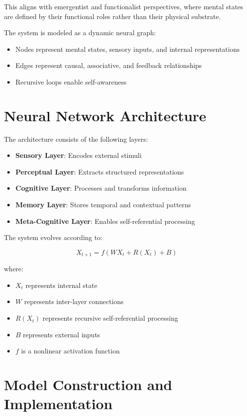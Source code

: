 \documentclass[12pt]{article}
\begin{document}
This aligns with emergentist and functionalist perspectives, where mental states are defined by their functional roles rather than their physical substrate.

The system is modeled as a dynamic neural graph:

\begin{itemize}
\item Nodes represent mental states, sensory inputs, and internal representations
\item Edges represent causal, associative, and feedback relationships
\item Recursive loops enable self-awareness
\end{itemize}

\section{Neural Network Architecture}

The architecture consists of the following layers:

\begin{itemize}
\item \textbf{Sensory Layer}: Encodes external stimuli
\item \textbf{Perceptual Layer}: Extracts structured representations
\item \textbf{Cognitive Layer}: Processes and transforms information
\item \textbf{Memory Layer}: Stores temporal and contextual patterns
\item \textbf{Meta-Cognitive Layer}: Enables self-referential processing
\end{itemize}

The system evolves according to:

\[
X_{t+1} = f(WX_t + R(X_t) + B)
\]

where:
\begin{itemize}
\item $X_t$ represents internal state
\item $W$ represents inter-layer connections
\item $R(X_t)$ represents recursive self-referential processing
\item $B$ represents external inputs
\item $f$ is a nonlinear activation function
\end{itemize}

\section{Model Construction and Implementation}
\end{document}
